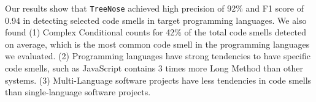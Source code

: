 Our results show that \texttt{TreeNose} achieved high precision of 92\% and F1 score of 0.94 in detecting selected code smells in target programming languages.
We also found (1) Complex Conditional counts for 42\% of the total code smells detected on average, which is the most common code smell in the programming languages we evaluated.
(2) Programming languages have strong tendencies to have specific code smells, such as JavaScript contains 3 times more Long Method than other systems.
(3) Multi-Language software projects have less tendencies in code smells than single-language software projects.